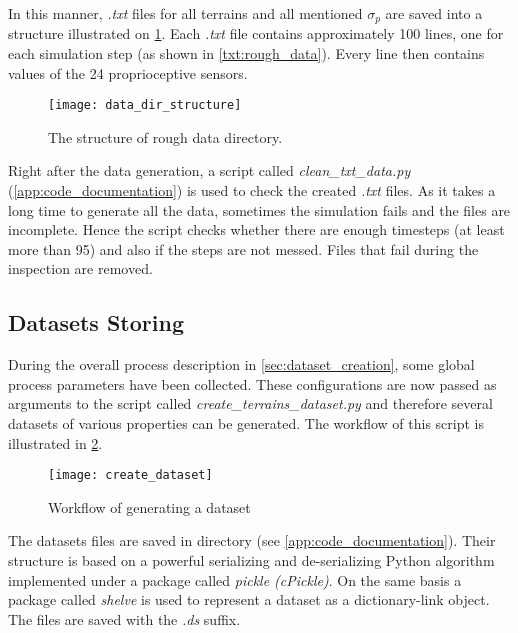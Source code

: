 In this manner, \textit{.txt} files for all terrains and all mentioned $ \sigma_p $ are saved into a structure illustrated on \cref{img:data_dir_structure}. Each \textit{.txt} file contains approximately 100 lines, one for each simulation step (as shown in \cref{txt:rough_data}). Every line then contains values of the 24 proprioceptive sensors.

\begin{figure}[H]
  \centering
  \texttt{[image: data\_dir\_structure]}
  \caption{The structure of rough data directory.}
  \label{img:data_dir_structure}
\end{figure}

Right after the data generation, a script called \textit{clean\_txt\_data.py} (\ref{app:code_documentation}) is used to check the created \textit{.txt} files. As it takes a long time to generate all the data, sometimes the simulation fails and the files are incomplete. Hence the script checks whether there are enough timesteps (at least more than 95) and also if the steps are not messed. Files that fail during the inspection are removed.

\subsection*{Datasets Storing} \label{ssec:app:datasets_storing}
During the overall process description in \cref{sec:dataset_creation}, some global process parameters have been collected. These configurations are now passed as arguments to the script called \textit{create\_terrains\_dataset.py} and therefore several datasets of various properties can be generated. The workflow of this script is illustrated in \cref{app:img:create_dataset}.

\begin{figure}[H]
  \centering
  \texttt{[image: create\_dataset]}
  \caption{Workflow of generating a dataset}
  \label{app:img:create_dataset}
\end{figure}

The datasets files are saved in directory  (see \ref{app:code_documentation}). Their structure is based on a powerful serializing and de-serializing Python algorithm implemented under a package called \textit{pickle (cPickle)}. On the same basis a package called \textit{shelve} is used to represent a dataset as a dictionary-link object. The files are saved with the \textit{.ds} suffix.

